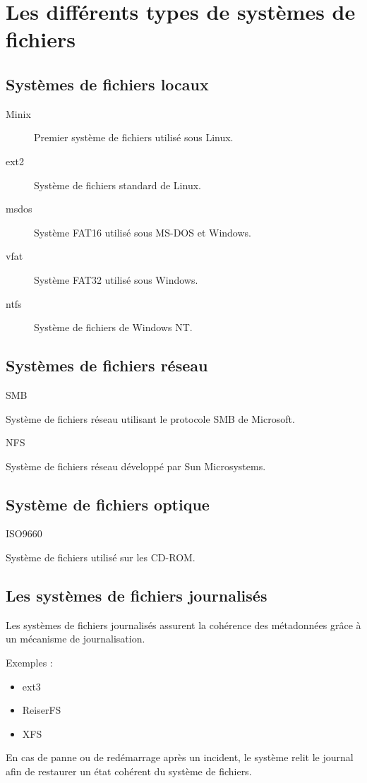 \chapter{Les différents types de systèmes de fichiers}
	\section{Systèmes de fichiers locaux}
\begin{description}
    \item[Minix] Premier système de fichiers utilisé sous Linux.
    \item[ext2] Système de fichiers standard de Linux.
    \item[msdos] Système FAT16 utilisé sous MS-DOS et Windows.
    \item[vfat] Système FAT32 utilisé sous Windows.
    \item[ntfs] Système de fichiers de Windows NT.
\end{description}

	\section{Systèmes de fichiers réseau}
SMB

Système de fichiers réseau utilisant le protocole SMB de Microsoft.

NFS

Système de fichiers réseau développé par Sun Microsystems.

	\section{Système de fichiers optique}
ISO9660

Système de fichiers utilisé sur les CD-ROM.

	\section{Les systèmes de fichiers journalisés}
Les systèmes de fichiers journalisés assurent la cohérence des métadonnées grâce à un mécanisme de journalisation.

Exemples :
\begin{itemize}[label=$\bullet$]
    \item ext3
    \item ReiserFS
    \item XFS
\end{itemize}
En cas de panne ou de redémarrage après un incident, le système relit le journal afin de restaurer un état cohérent du système de fichiers.